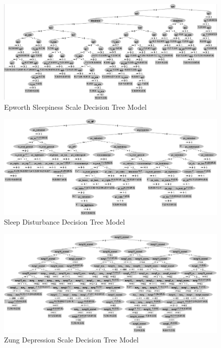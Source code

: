 \documentclass[10pt,conference,a4paper]{IEEEtran}
\begin{document}
\begin{figure}[h]
    \centering
    \includegraphics[width=1.9\columnwidth]{models/epworth tree.png}
    \caption{Epworth Sleepiness Scale Decision Tree Model}
    \label{fig:epworthTree}
\end{figure}
\begin{figure}[h]
    \centering
    \includegraphics[width=1.9\columnwidth]{models/sleep disturbance tree.png}
    \caption{Sleep Disturbance Decision Tree Model}
    \label{fig:disturbanceTree}
\end{figure}
\begin{figure}[h]
    \centering
    \includegraphics[width=1.9\columnwidth]{models/zung tree.png}
    \caption{Zung Depression Scale Decision Tree Model}
    \label{fig:zungTree}
\end{figure}
\end{document}
